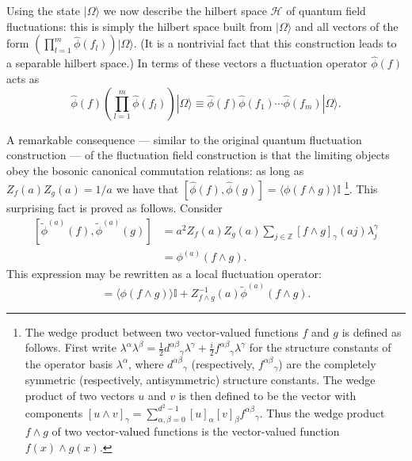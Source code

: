 \documentclass[prl,twocolumn,lengthcheck,superscriptaddress]{revtex4-1}
\theoremstyle{definition}
\theoremstyle{remark}
\begin{document}
Using the state $|\Omega\rangle$ we now describe the hilbert space $\mathcal{H}$ of quantum field fluctuations: this is simply the hilbert space built from $|\Omega\rangle$ and all vectors of the form $\left(\prod_{l=1}^m\widehat{\phi}(f_l)\right)|\Omega\rangle$. (It is a nontrivial fact that this construction leads to a separable hilbert space.) In terms of these vectors a fluctuation operator $\widehat{\phi}(f)$ acts as
\begin{equation}	
	\widehat{\phi}(f) \left(\prod_{l=1}^m\widehat{\phi}(f_l)\right)|\Omega\rangle \equiv \widehat{\phi}(f) \widehat{\phi}(f_1)\cdots \widehat{\phi}(f_m)|\Omega\rangle.
\end{equation}

A remarkable consequence --- similar to the original quantum fluctuation construction \cite{hepp:1973b, verbeure:2011a} --- of the fluctuation field construction is that the limiting objects obey the bosonic canonical commutation relations: as long as $Z_f(a)Z_g(a) = 1/a$ we have that $[\widehat{\phi}(f), \widehat{\phi}(g)] = \langle \phi(f\wedge g)\rangle \mathbb{I}$ \footnote{The wedge product between two vector-valued functions $f$ and $g$ is defined as follows. First write $\lambda^\alpha\lambda^\beta =  \frac12{d^{\alpha\beta}}_\gamma \lambda^\gamma + \frac{i}{2}{f^{\alpha\beta}}_{\gamma}\lambda^\gamma$ for the structure constants of the operator basis $\lambda^\alpha$, where ${d^{\alpha\beta}}_\gamma$ (respectively, ${f^{\alpha\beta}}_{\gamma}$) are the completely symmetric (respectively, antisymmetric) structure constants. The wedge product of two vectors $u$ and $v$  is then defined to be the vector with components $[u\wedge v]_{\gamma} = \sum_{\alpha,\beta=0}^{d^2 -1}[u]_\alpha[v]_\beta {f^{\alpha\beta}}_\gamma$. Thus the wedge product $f\wedge g$ of two vector-valued functions is the vector-valued function $f(x)\wedge g(x)$.}. This surprising fact is proved as follows.  Consider
\begin{equation}
	\begin{split}
		[\widetilde{\phi}^{(a)}(f), \widetilde{\phi}^{(a)}(g)] &= a^2Z_f(a)Z_g(a)\sum_{j\in\mathbb{Z}} [f\wedge g]_\gamma(aj) \lambda^\gamma_j \\
		&= \phi^{(a)}(f\wedge g).
	\end{split}
\end{equation} 
This expression may be rewritten as a local fluctuation operator:
\begin{equation}
	[\widetilde{\phi}^{(a)}(f), \widetilde{\phi}^{(a)}(g)] = \langle\phi(f\wedge g)\rangle \mathbb{I} + Z_{f\wedge g}^{-1}(a)\widetilde{\phi}^{(a)}(f\wedge g).
\end{equation}
\end{document}

